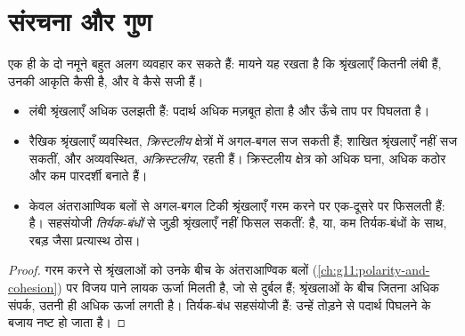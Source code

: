 \section{संरचना और गुण}

एक ही  के दो नमूने बहुत अलग व्यवहार कर सकते हैं: मायने यह रखता है कि
श्रृंखलाएँ कितनी लंबी हैं, उनकी आकृति कैसी है, और वे कैसे सजी हैं।

\begin{proposition}[श्रृंखलाएँ और गुण]\label{prop:g12:polymers:properties}
\begin{itemize}
  \item लंबी श्रृंखलाएँ अधिक उलझती हैं: पदार्थ अधिक मज़बूत होता है और
        ऊँचे ताप पर पिघलता है।
  \item रैखिक श्रृंखलाएँ व्यवस्थित, \emph{क्रिस्टलीय} क्षेत्रों में अगल-बगल
        सज सकती हैं; शाखित श्रृंखलाएँ नहीं सज सकतीं, और
        अव्यवस्थित, \emph{अक्रिस्टलीय}, रहती हैं। क्रिस्टलीय क्षेत्र
         को अधिक घना, अधिक कठोर और कम पारदर्शी बनाते हैं।
  \item केवल अंतराआण्विक बलों से अगल-बगल टिकी श्रृंखलाएँ गरम करने पर
        एक-दूसरे पर फिसलती हैं:   है। सहसंयोजी
        \emph{तिर्यक-बंधों} से जुड़ी श्रृंखलाएँ नहीं फिसल सकतीं: 
         है, या, कम तिर्यक-बंधों के साथ, रबड़ जैसा प्रत्यास्थ
        ठोस।
\end{itemize}
\end{proposition}

\begin{proof}
गरम करने से श्रृंखलाओं को उनके बीच के अंतराआण्विक
बलों (\cref{ch:g11:polarity-and-cohesion}) पर विजय पाने लायक ऊर्जा मिलती है, जो
 से दुर्बल हैं; श्रृंखलाओं के बीच जितना अधिक संपर्क, उतनी ही
अधिक ऊर्जा लगती है। तिर्यक-बंध सहसंयोजी हैं: उन्हें तोड़ने से
पदार्थ पिघलने के बजाय नष्ट हो जाता है।
\end{proof}

